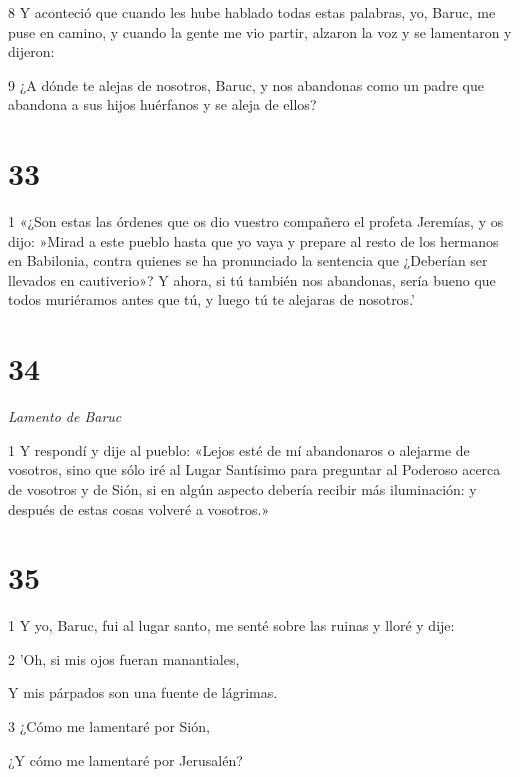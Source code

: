 \par 8 Y aconteció que cuando les hube hablado todas estas palabras, yo, Baruc, me puse en camino, y cuando la gente me vio partir, alzaron la voz y se lamentaron y dijeron:

\par 9 ¿A dónde te alejas de nosotros, Baruc, y nos abandonas como un padre que abandona a sus hijos huérfanos y se aleja de ellos?

\chapter{33}

\par 1 «¿Son estas las órdenes que os dio vuestro compañero el profeta Jeremías, y os dijo: »Mirad a este pueblo hasta que yo vaya y prepare al resto de los hermanos en Babilonia, contra quienes se ha pronunciado la sentencia que ¿Deberían ser llevados en cautiverio»? Y ahora, si tú también nos abandonas, sería bueno que todos muriéramos antes que tú, y luego tú te alejaras de nosotros.'

\chapter{34}

\par \textit{Lamento de Baruc}

\par 1 Y respondí y dije al pueblo: «Lejos esté de mí abandonaros o alejarme de vosotros, sino que sólo iré al Lugar Santísimo para preguntar al Poderoso acerca de vosotros y de Sión, si en algún aspecto debería recibir más iluminación: y después de estas cosas volveré a vosotros.»

\chapter{35}

\par 1 Y yo, Baruc, fui al lugar santo, me senté sobre las ruinas y lloré y dije:

\par 2 'Oh, si mis ojos fueran manantiales,

\par Y mis párpados son una fuente de lágrimas.

\par 3 ¿Cómo me lamentaré por Sión,

\par ¿Y cómo me lamentaré por Jerusalén?

